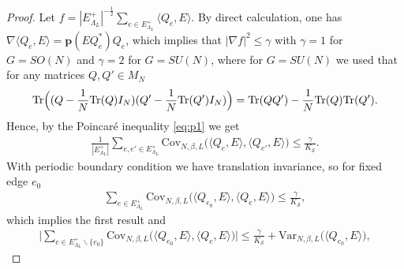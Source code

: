 \documentclass[11pt,UTF-8,reqno]{amsart}
\numberwithin{equation}{section}
\def\proj{\mathbf{p}}
\def\var{{\mathrm{Var}}}
\def\cov{{\mathrm{Cov}}}
\def\<{{\langle}}
\def\>{{\rangle}}
\def\tr{\mathrm {tr}}
\def\cS{{\mathcal S}}
\def\leq{\leqslant}
\def\<{{\langle}}
\def\>{{\rangle}}
\def\tr{\mathrm {tr}}
\def\tr{{\rm Tr}}
\def\mfg{\mathfrak{g}}
\def\leq{\leqslant}
\def\<{\langle} \def\>{\rangle}
\begin{document}


\begin{proof}
	Let $f= |E_{\Lambda_L}^+|^{-\frac12}\sum_{e\in E_{\Lambda_L}^+} \<Q_e,E\>$. By direct calculation, one has $\nabla \<Q_e,E\>=\proj(EQ_e^*)Q_e$, which implies that
	$|\nabla f|^2\leq \gamma$ with $\gamma=1$ for $G=SO(N)$ and $\gamma=2$ for $G=SU(N)$, where for $G=SU(N)$ we used that for any matrices 
	$Q, Q'\in M_N$
	\begin{align}\label{eq:tr}
		\tr\Big((Q-\frac1N\tr(Q)I_N)(Q'-\frac1N\tr(Q')I_N)\Big)
		=\tr(QQ')-\frac1N\tr(Q)\tr(Q').
	\end{align}
	Hence, by the Poincar\'e inequality \eqref{eq:p1} we get
	\begin{align*}
		\frac1{|E_{\Lambda_L}^+|}\sum_{e,e'\in E_{\Lambda_L}^+}\cov_{N,\beta,L}\Big(\<Q_e,E\>,\<Q_{e'},E\>\Big)\leq \frac\gamma{K_\cS }.
	\end{align*}
	With periodic boundary condition we have translation invariance,
	so for fixed edge $e_0$
	\begin{align*}
		\sum_{ e\in E_{\Lambda_L}^+ } \!\! \cov_{N,\beta,L}\Big(\<Q_{e_0},E\>,\<Q_e,E\>\Big)\leq \frac\gamma{K_\cS },
	\end{align*}
	which implies the first result and
	\begin{align*}
		\Big|  \sum_{ e\in E_{\Lambda_L}^+ \backslash\{e_0\}} \!\!\!\!  \cov_{N,\beta,L}\Big(\<Q_{e_0},E\>,\<Q_e,E\>\Big)\Big|\leq \frac\gamma{K_\cS }+\var_{N,\beta,L}\Big(\<Q_{e_0},E\>\Big),

\end{align*}
\end{proof}
\end{document}
